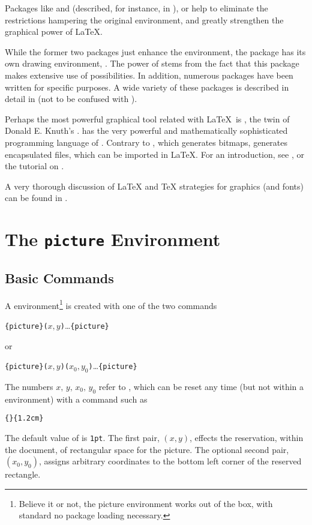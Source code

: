 Packages like  and  (described, for instance, in \companion), or
 help to eliminate the restrictions hampering the original  
environment, and greatly strengthen the graphical power of \LaTeX.

While the former two packages just enhance the  environment, the 
package has its own drawing environment, . The power of  stems
from the fact that this package makes extensive use of \PSi{} possibilities.
In addition, numerous packages have been written for specific purposes. A wide variety of these
packages is described in detail in \graphicscompanion{} (not to be confused with \companion).

Perhaps the most powerful graphical tool related with \LaTeX\ is \MP, the twin of
Donald E. Knuth's \MF. \MP{} has the very powerful and 
mathematically sophisticated programming language of \MF. Contrary to \MF,
which generates bitmaps, \MP{} generates encapsulated \PSi{} files, 
which can be imported in \LaTeX. For an introduction, see \hobby, or the tutorial on \cite{ursoswald}.

A very thorough discussion of \LaTeX{} and \TeX{} strategies for graphics (and fonts) can 
be found in \hoenig.

\section{The \texttt{picture} Environment}

\subsection{Basic Commands}

A  environment\footnote{Believe it or not, the picture environment works out of the
box, with standard \LaTeXe{} no package loading necessary.} is created with one of the two commands
\begin{lscommand}
\verb|{picture}(|$x,y$\verb|)|\ldots{}\verb|{picture}|
\end{lscommand}
\noindent or
\begin{lscommand}
\verb|{picture}(|$x,y$\verb|)(|$x_0,y_0$\verb|)|\ldots{}\verb|{picture}|
\end{lscommand}
The numbers $x,\,y,\,x_0,\,y_0$ refer to , which can be reset any time
(but not within a  environment) with a command such as
\begin{lscommand}
\verb|{|\verb|}{1.2cm}|
\end{lscommand}
The default value of  is \texttt{1pt}. The first pair, $(x,y)$, effects
the reservation, within the document, of rectangular space for the picture. The optional
second pair, $(x_0,y_0)$, assigns arbitrary coordinates to the bottom left corner of the
reserved rectangle. 

